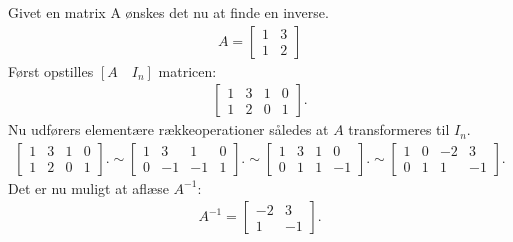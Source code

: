 \begin{eks}
Givet en matrix A ønskes det nu at finde en inverse. 
\begin{align*}
A= \begin{bmatrix}
1 & 3 \\
1 & 2
\end{bmatrix}
\end{align*}
Først opstilles $[A \quad I_n]$ matricen: 
\begin{align*}
\begin{bmatrix}
1 & 3 & 1 & 0 \\
1 & 2 & 0 & 1
\end{bmatrix}.
\end{align*}
Nu udførers elementære rækkeoperationer således at $A$ transformeres til $I_n$. 
\begin{align*}
\begin{bmatrix}
1 & 3 & 1 & 0 \\
1 & 2 & 0 & 1
\end{bmatrix}.
\sim \begin{bmatrix}
1 & 3 & 1 & 0 \\
0 & -1 & -1 & 1
\end{bmatrix}.
\sim \begin{bmatrix}
1 & 3 & 1 & 0 \\
0 & 1 & 1 & -1
\end{bmatrix}.
\sim \begin{bmatrix}
1 & 0 & -2 & 3 \\
0 & 1 & 1 & -1
\end{bmatrix}.
\end{align*}
Det er nu muligt at aflæse $A^{-1}$:
\begin{align*}
A^{-1} =\begin{bmatrix}
-2 & 3\\
1 & -1 
\end{bmatrix}.
\end{align*}
\end{eks}


